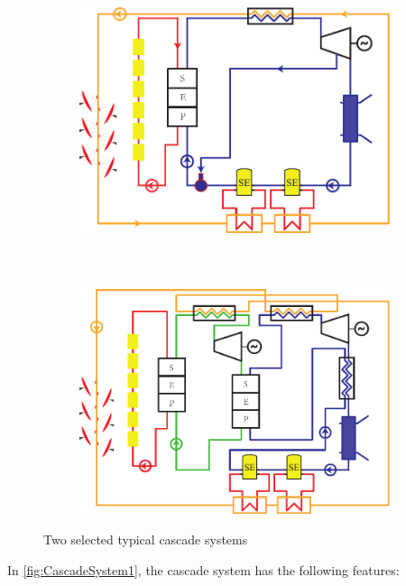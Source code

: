 \begin{figure}[htbp]
\centering
	\begin{subfigure}[b]{0.4\columnwidth}
	\includegraphics[width = \columnwidth]{fig/CascadeSystem1}
	\caption{}\label{fig:CascadeSystem1}
	\end{subfigure}
	~
\begin{subfigure}[b]{0.4\columnwidth}
	\includegraphics[width = \columnwidth]{fig/CascadeSystem2}
	\caption{}\label{fig:CascadeSystem2}
	\end{subfigure}
	\caption{Two selected typical cascade systems}
	\label{fig:CascadeSystems}
\end{figure}

In \autoref{fig:CascadeSystem1}, the cascade system has the following features:

